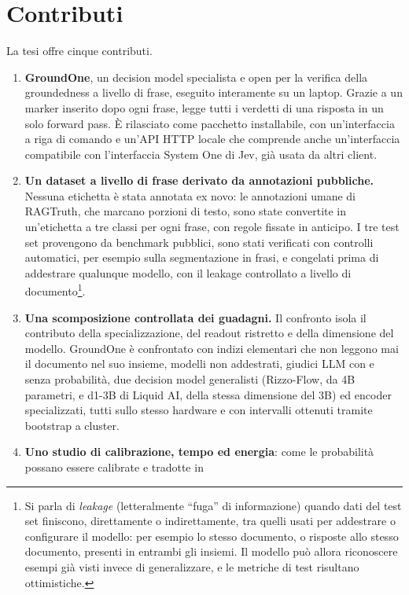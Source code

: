 \section{Contributi}
\label{sec:intro-contributions}

La tesi offre cinque contributi.
\begin{enumerate}
\item \textbf{GroundOne}, un decision model specialista e open per la verifica della groundedness a livello di frase,
eseguito interamente su un laptop. Grazie a un marker inserito dopo ogni frase, legge tutti i verdetti di una risposta in
un solo forward pass. È rilasciato come pacchetto installabile, con un'interfaccia a riga di comando e un'API HTTP locale
che comprende anche un'interfaccia compatibile con l'interfaccia System One di Jev, già usata da altri client.
\item \textbf{Un dataset a livello di frase derivato da annotazioni pubbliche.} Nessuna etichetta è stata annotata ex
novo: le annotazioni umane di RAGTruth, che marcano porzioni di testo, sono state convertite in un'etichetta a tre
classi per ogni frase, con regole fissate in anticipo. I tre test set provengono da benchmark pubblici, sono stati
verificati con controlli automatici, per esempio sulla segmentazione in frasi, e congelati prima di addestrare
qualunque modello, con il leakage controllato a livello di documento\footnote{Si parla di \emph{leakage} (letteralmente
``fuga'' di informazione) quando dati del test set finiscono, direttamente o indirettamente, tra quelli usati per
addestrare o configurare il modello: per esempio lo stesso documento, o risposte allo stesso documento, presenti in
entrambi gli insiemi. Il modello può allora riconoscere esempi già visti invece di generalizzare, e le metriche di test
risultano ottimistiche.}.
\item \textbf{Una scomposizione controllata dei guadagni.} Il confronto isola il contributo della specializzazione, del
readout ristretto e della dimensione del modello. GroundOne è confrontato con indizi elementari che non leggono mai il documento nel suo insieme,
modelli non addestrati, giudici LLM con e senza probabilità, due decision model generalisti (Rizzo-Flow, da 4B parametri, e d1-3B di Liquid
AI, della stessa dimensione del 3B) ed encoder specializzati, tutti sullo stesso hardware e con intervalli ottenuti
tramite bootstrap a cluster.
\item \textbf{Uno studio di calibrazione, tempo ed energia}: come le probabilità possano essere calibrate e tradotte in

\end{enumerate}
